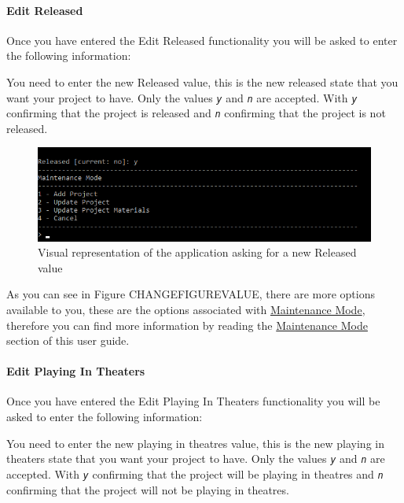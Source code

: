 \documentclass[
  english,
  a4paper,
,tablecaptionabove
]{scrartcl}
\begin{document}
\newpage

\hypertarget{edit-released}{%
\paragraph{Edit Released}\label{edit-released}}

Once you have entered the Edit Released functionality you will be asked
to enter the following information:

You need to enter the new Released value, this is the new released state
that you want your project to have. Only the values \emph{\texttt{y}}
and \emph{\texttt{n}} are accepted. With \emph{\texttt{y}} confirming
that the project is released and \emph{\texttt{n}} confirming that the
project is not released.

\begin{figure}
\centering
\includegraphics{images/user-guide/maintenance-mode/update-project-released.png}
\caption{Visual representation of the application asking for a new
Released value}
\end{figure}

As you can see in Figure CHANGEFIGUREVALUE, there are more options
available to you, these are the options associated with
\protect\hyperlink{using-maintenance-mode}{Maintenance Mode}, therefore
you can find more information by reading the
\protect\hyperlink{using-maintenance-mode}{Maintenance Mode} section of
this user guide.

\newpage

\hypertarget{edit-playing-in-theaters}{%
\paragraph{Edit Playing In Theaters}\label{edit-playing-in-theaters}}

Once you have entered the Edit Playing In Theaters functionality you
will be asked to enter the following information:

You need to enter the new playing in theatres value, this is the new
playing in theaters state that you want your project to have. Only the
values \emph{\texttt{y}} and \emph{\texttt{n}} are accepted. With
\emph{\texttt{y}} confirming that the project will be playing in
theatres and \emph{\texttt{n}} confirming that the project will not be
playing in theatres.
\end{document}
